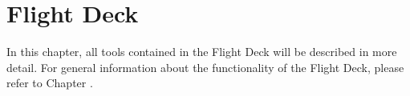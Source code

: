 
\chapter{Flight Deck}
\label{chap:flight_deck}

In this chapter, all tools contained in the Flight Deck will be described in more detail.
For general information about the functionality of the Flight Deck, please refer to Chapter .







